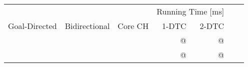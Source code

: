 \begin{tabular}{cccrrrr}
	\toprule
	              &               &         & \multicolumn{2}{c}{Running Time [\si{\milli\second}]}         \\
	Goal-Directed & Bidirectional & Core CH & 1-DTC                                                 & 2-DTC \\
	\midrule
	\xmark        & \cmark        & \cmark  & @                                                     & @     \\
	\cmark        & \cmark        & \cmark  & @                                                     & @     \\
	\bottomrule
\end{tabular}